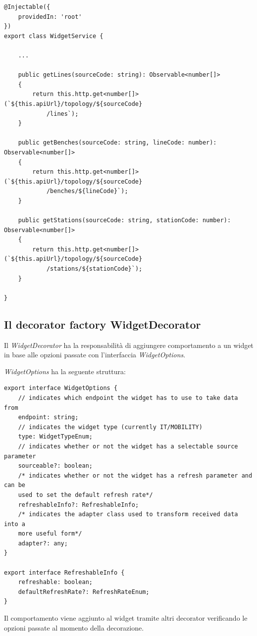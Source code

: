 \begin{lstlisting}[caption={Classe WidgetService, metodi per recuperare linee, banchi e stazioni}, style=javaScriptCode]
@Injectable({
    providedIn: 'root'
})
export class WidgetService {

    ...
        
    public getLines(sourceCode: string): Observable<number[]> 
    {
        return this.http.get<number[]>(`${this.apiUrl}/topology/${sourceCode}
            /lines`);
    }

    public getBenches(sourceCode: string, lineCode: number): Observable<number[]> 
    {
        return this.http.get<number[]>(`${this.apiUrl}/topology/${sourceCode}
            /benches/${lineCode}`);
    }

    public getStations(sourceCode: string, stationCode: number): Observable<number[]> 
    {
        return this.http.get<number[]>(`${this.apiUrl}/topology/${sourceCode}
            /stations/${stationCode}`);
    }

}
\end{lstlisting}

\subsection{Il decorator factory WidgetDecorator}
\label{subsec:widgetDecorator}
Il \textit{WidgetDecorator} ha la responsabilità di aggiungere comportamento a un widget in base alle opzioni passate con l'interfaccia \textit{WidgetOptions}.

\textit{WidgetOptions} ha la seguente struttura:

\begin{lstlisting}[caption={WidgetOptions e RefreshableInfo}, style=javaScriptCode]
export interface WidgetOptions {
    // indicates which endpoint the widget has to use to take data from
    endpoint: string;
    // indicates the widget type (currently IT/MOBILITY)
    type: WidgetTypeEnum;
    // indicates whether or not the widget has a selectable source parameter
    sourceable?: boolean;
    /* indicates whether or not the widget has a refresh parameter and can be 
    used to set the default refresh rate*/
    refreshableInfo?: RefreshableInfo; 
    /* indicates the adapter class used to transform received data into a 
    more useful form*/
    adapter?: any;
}

export interface RefreshableInfo {
    refreshable: boolean;
    defaultRefreshRate?: RefreshRateEnum;
}
\end{lstlisting}
Il comportamento viene aggiunto al widget tramite altri decorator verificando le opzioni passate al momento della decorazione.

